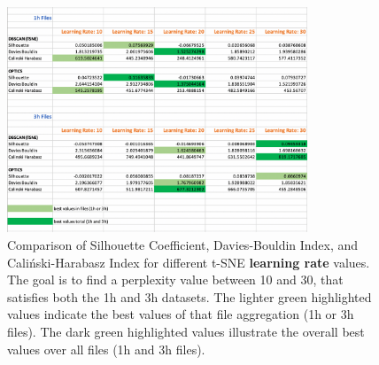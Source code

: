 \begin{figure}
  \centering
  \includegraphics[width=0.8\textwidth]{./images/tsneParametersTest/learningRate/learningRateEvaluationScoresDetailed3.png}
  \caption{Comparison of Silhouette Coefficient, Davies-Bouldin Index, and Caliński-Harabasz Index for different t-SNE \textbf{learning rate} values. The goal is to find a perplexity value between 10
  and 30, that satisfies both the 1h and 3h datasets. The lighter green highlighted values indicate the best values of that file aggregation (1h or 3h files). The dark green highlighted values illustrate the overall best values over all files (1h and 3h files).}
  \label{figure:learningRateEvaluationScoresDetailed3}
\end{figure}


